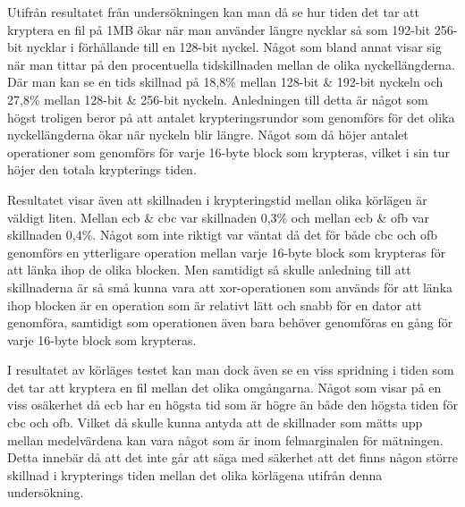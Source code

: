 \label{chap:discussion}

Utifrån resultatet från undersökningen kan man då se hur tiden det tar att kryptera en fil på 1MB ökar när man använder längre nycklar så som 192-\gls{bit} 256-\gls{bit} nycklar
i förhållande till en 128-\gls{bit} nyckel. Något som bland annat visar sig när man tittar på den procentuella tidskillnaden mellan de olika nyckellängderna. Där man kan se en
tids skillnad på 18,8\% mellan 128-\gls{bit} \& 192-\gls{bit} nyckeln och 27,8\% mellan 128-\gls{bit} \& 256-\gls{bit} nyckeln.
Anledningen till detta är något som högst troligen beror på att antalet krypteringsrundor som genomförs för det olika nyckellängderna ökar när nyckeln blir längre.
Något som då höjer antalet operationer som genomförs för varje 16-\gls{byte} block som krypteras, vilket i sin tur höjer den totala krypterings tiden.

Resultatet visar även att skillnaden i krypteringstid mellan olika körlägen är väldigt liten. Mellan \acrshort{ecb} \& \acrshort{cbc} var skillnaden 0,3\% och mellan \acrshort{ecb}
\& \acrshort{ofb} var skillnaden 0,4\%. Något som inte riktigt var väntat då det för både \acrshort{cbc} och \acrshort{ofb}
genomförs en ytterligare operation mellan varje 16-\gls{byte} block som krypteras för att länka ihop de olika blocken. Men samtidigt så skulle anledning till att skillnaderna är
så små kunna vara att \gls{xor}-operationen som används för att länka ihop blocken är en operation som är relativt lätt och snabb för en dator att genomföra, samtidigt som
operationen även bara behöver genomföras en gång för varje 16-\gls{byte} block som krypteras.

I resultatet av körläges testet kan man dock även se en viss spridning i tiden som det tar att kryptera en fil mellan det olika omgångarna.
Något som visar på en viss osäkerhet då \acrshort{ecb} har en högsta tid som är högre än både den högsta tiden för \acrshort{cbc} och \acrshort{ofb}. Vilket då skulle kunna antyda
att de skillnader som mätts upp mellan medelvärdena kan vara något som är inom felmarginalen för mätningen. Detta innebär då att det inte går att säga med säkerhet att
det finns någon större skillnad i krypterings tiden mellan det olika körlägena utifrån denna undersökning.

